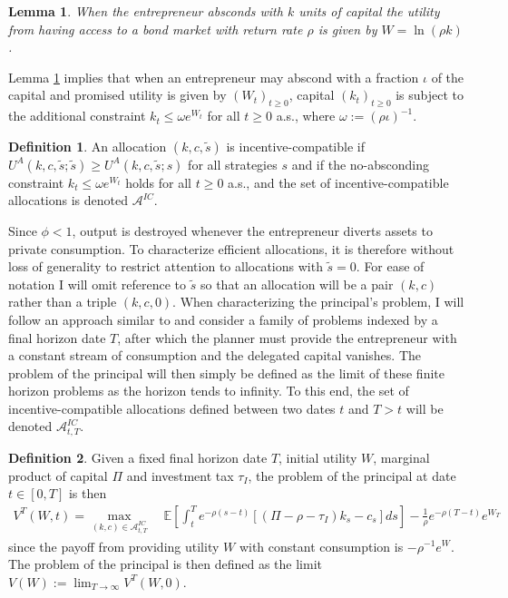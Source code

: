 \documentclass[11pt]{article}
\theoremstyle{plain}
\newtheorem{lemma}[thm]{Lemma}
\theoremstyle{definition} %
\newtheorem{defn}{Definition}[section]
\begin{document}
\begin{lemma} \label{abscondLEMMAlog}
When the entrepreneur absconds with $k$ units of capital the utility from having access to a bond market with return rate $\rho$ is given by $W = \ln(\rho k)$.
\end{lemma} 

Lemma \ref{abscondLEMMAlog} implies that when an entrepreneur may abscond with a fraction $\iota$ of the capital and promised utility is given by $(W_t)_{t\geq0}$, capital $(k_t)_{t\geq0}$ is subject to the additional constraint $k_t \leq \omega e^{W_t}$ for all $t\geq0$ a.s., where $\omega := (\rho\iota)^{-1}$. 

\begin{defn}\label{ICdefn}
An allocation $(k,c,\tilde{s})$ is incentive-compatible if $U^A(k, c, \tilde{s}; \tilde{s}) \geq U^A(k, c, \tilde{s}; s)$ for all strategies $s$ and if the no-absconding constraint $k_t \leq \omega e^{W_t}$ holds for all $t \geq 0$ a.s., and the set of incentive-compatible allocations is denoted $\mathcal{A}^{IC}$. 
\end{defn}

Since $\phi < 1$, output is destroyed whenever the entrepreneur diverts assets to private consumption. To characterize efficient allocations, it is therefore without loss of generality to restrict attention to allocations with $\tilde{s} = 0$. For ease of notation I will omit reference to $\tilde{s}$ so that an allocation will be a pair $(k,c)$ rather than a triple $(k,c,0)$. When characterizing the principal's problem, I will follow an approach similar to \cite{toda_incomplete_2014} and consider a family of problems indexed by a final horizon date $T$, after which the planner must provide the entrepreneur with a constant stream of consumption and the delegated capital vanishes. The problem of the principal will then simply be defined as the limit of these finite horizon problems as the horizon tends to infinity. To this end, the set of incentive-compatible allocations defined between two dates $t$ and $T > t$ will be denoted $\mathcal{A}^{IC}_{t,T}$. 

\begin{defn}\label{Pprob}
Given a fixed final horizon date $T$, initial utility $W$, marginal product of capital $\Pi$ and investment tax $\tau_I$, the problem of the principal at date $t \in [0,T]$ is then
\begin{equation}
\begin{aligned}
V^T(W,t) = \max_{(k,c) \in \mathcal{A}^{IC}_{t,T}} & \ \mathbb{E}{\left[\int_t^Te^{-\rho (s-t)}[(\Pi - \rho - \tau_I)k_s - c_s] ds\right]} - \frac{1}{\rho}e^{-\rho (T- t)}e^{W_T}
\end{aligned}
\label{VT}
\end{equation}
since the payoff from providing utility $W$ with constant consumption is $-\rho^{-1}e^W$. The problem of the principal is then defined as the limit $V(W) := \lim_{T \rightarrow \infty} V^T(W,0)$. 
\end{defn} 
\end{document}
